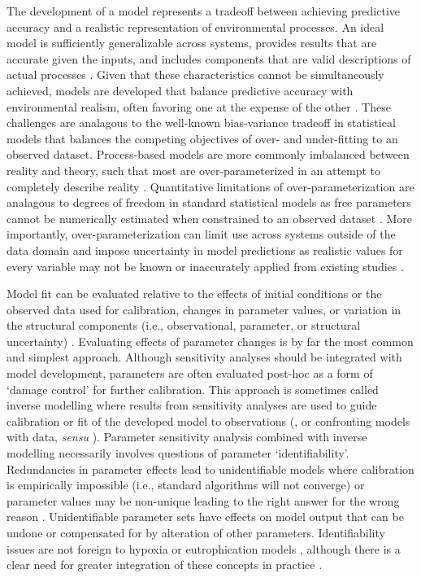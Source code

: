 \documentclass[review]{elsarticle}\usepackage[]{graphicx}\usepackage[]{color}
\begin{document}
The development of a model represents a tradeoff between achieving predictive accuracy and a realistic representation of environmental processes. An ideal model is sufficiently generalizable across systems, provides results that are accurate given the inputs, and includes components that are valid descriptions of actual processes \citep{Levins66, Ganju16}. Given that these characteristics cannot be simultaneously achieved, models are developed that balance predictive accuracy with environmental realism, often favoring one at the expense of the other \citep{Morrison99,Ganju16}.  These challenges are analagous to the well-known bias-variance tradeoff in statistical models that balances the competing objectives of over- and under-fitting to an observed dataset. Process-based models are more commonly imbalanced between reality and theory, such that most are over-parameterized in an attempt to completely describe reality \citep{Denman03,Nossent12,Petrucci14}.  Quantitative limitations of over-parameterization are analagous to degrees of freedom in standard statistical models as free parameters cannot be numerically estimated when constrained to an observed dataset \citep{Kirchner06}.  More importantly, over-parameterization can limit use across systems outside of the data domain and impose uncertainty in model predictions as realistic values for every variable may not be known or inaccurately applied from existing studies \citep{Durand02,Refsgaard07,Wade08}.

Model fit can be evaluated relative to the effects of initial conditions or the observed data used for calibration, changes in parameter values, or variation in the structural components (i.e., observational, parameter, or structural uncertainty) \citep{Beck87}.  Evaluating effects of parameter changes is by far the most common and simplest approach.  Although sensitivity analyses should be integrated with model development, parameters are often evaluated post-hoc as a form of `damage control' for further calibration.  This approach is sometimes called inverse modelling where results from sensitivity analyses are used to guide calibration or fit of the developed model to observations (\citealt{Soetaert10}, or confronting models with data, \textit{sensu} \citealt{Hilborn97}).  Parameter sensitivity analysis combined with inverse modelling necessarily involves questions of parameter `identifiability'.  Redundancies in parameter effects lead to unidentifiable models where calibration is empirically impossible (i.e., standard algorithms will not converge) or parameter values may be non-unique leading to the right answer for the wrong reason \citep{Kirchner06}. Unidentifiable parameter sets have effects on model output that can be undone or compensated for by alteration of other parameters.  Identifiability issues are not foreign to hypoxia or eutrophication models  \citep{Omlin01,Estrada10,Mateus15}, although there is a clear need for greater integration of these concepts in practice \citep{Fasham06}.
\end{document}
